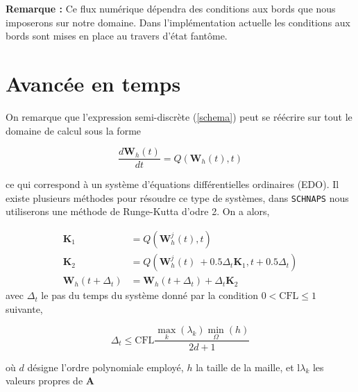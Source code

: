\documentclass[a4paper,oneside,10pt]{report}
\begin{document}
\textbf{Remarque :} Ce flux numérique dépendra des conditions aux bords que nous imposerons sur notre domaine. Dans l'implémentation actuelle les conditions aux bords sont mises en place au travers d'état fantôme.



\section{Avancée en temps}


On remarque que l'expression semi-discrète (\ref{schema}) peut se réécrire sur tout le domaine de calcul sous la forme

\begin{equation}
\frac{d\mathbf{W}_{h}(t)}{dt} = Q\left(\mathbf{W}_{h}(t),t\right)
\end{equation}

ce qui correspond à un système d'équations différentielles ordinaires (EDO). Il existe plusieurs méthodes pour résoudre ce type de systèmes, dans \texttt{SCHNAPS} nous utiliserons une méthode de Runge-Kutta d'odre 2. On a alors,


\begin{equation}
\begin{aligned}
\mathbf{K}_1 &= Q\left(\mathbf{W}_{h}^j(t),t\right)\\
\mathbf{K}_2 &= Q\left(\mathbf{W}_{h}^j(t)\ + 0.5\Delta_t\mathbf{K}_1 ,t + 0.5\Delta_t \right)\\
\mathbf{W}_{h}(t+\Delta_t) &= \mathbf{W}_{h}(t+\Delta_t) + \Delta_t\mathbf{K}_2
\end{aligned}
\end{equation}
avec $\Delta_t$ le pas du temps du système donné par la condition $0 < \mathrm{CFL} \leq 1$ suivante,

\begin{equation}
\Delta_t \leq \mathrm{CFL} \frac{\max\limits_k(\lambda_k) \min\limits_\Omega (h)}{2d+1}
\end{equation}

où $d$ désigne l'ordre polynomiale employé, $h$ la taille de la maille, et l$\lambda_k$ les valeurs propres de $\mathbf{A}$
\end{document}
